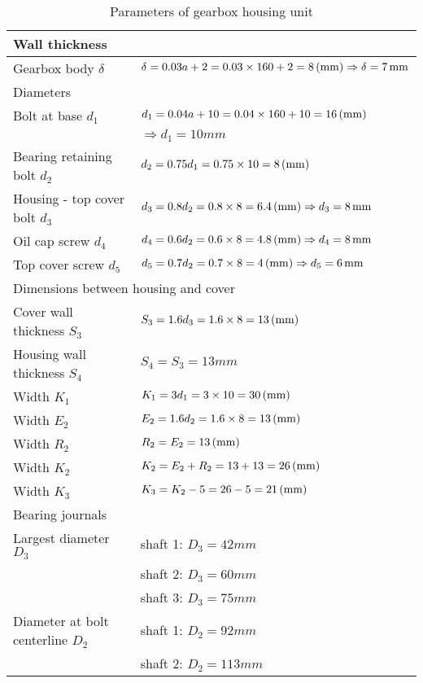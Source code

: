 \begin{table}
	\centering
	\caption{Parameters of gearbox housing unit}
	\begin{tabular}{ll}\toprule
		Wall thickness & \\\midrule
		Gearbox body $ \delta $ & $ \delta = 0.03a + 2 = 0.03\times 160 + 2 = 8 \, (\mathrm{mm}) \Rightarrow \delta = 7 \, \mathrm{mm}  $\\\midrule
		Diameters & \\\midrule
		Bolt at base $ d_1 $ & $ d_1 = 0.04a+10 = 0.04\times 160 + 10 = 16 \, (\mathrm{mm}) $\\
		& $ \Rightarrow d_1 = 10 \unit{mm}$\\
		Bearing retaining bolt $ d_2 $ & $ d_2 = 0.75d_1 = 0.75\times 10 = 8\, (\mathrm{mm})$\\
		Housing - top cover bolt $ d_3 $ & $ d_3 = 0.8 d_2 = 0.8\times 8 = 6.4 \, (\mathrm{mm}) \Rightarrow d_3 = 8\, \mathrm{mm} $\\
		Oil cap screw $ d_4 $ & $ d_4 = 0.6d_2 = 0.6\times 8 = 4.8 \, (\mathrm{mm}) \Rightarrow d_4 = 8\, \mathrm{mm} $\\
		Top cover screw $ d_5 $ & $ d_5  = 0.7 d_2 = 0.7\times 8 = 4 \, (\mathrm{mm})\Rightarrow d_5 = 6 \, \mathrm{mm} $\\\midrule
		\multicolumn{2}{l}{Dimensions between housing and cover} \\\midrule
		Cover wall thickness $ S_3 $ & $ S_3 = 1.6 d_3 = 1.6\times 8 = 13 \, (\mathrm{mm}) $\\
		Housing wall thickness $ S_4 $ & $ S_4 = S_3 = 13\unit{mm} $\\
		Width $ K_1 $ & $ K_1 = 3d_1 = 3\times 10 = 30 \, (\mathrm{mm})$\\
		Width $ E_2 $ & $ E_2 = 1.6d_2 = 1.6\times 8 = 13 \, (\mathrm{mm})$\\
		Width $ R_2 $ & $ R_2 = E_2 = 13 \, (\mathrm{mm})$\\
		Width $ K_2 $ & $ K_2 = E_2 + R_2 = 13+13 = 26 \, (\mathrm{mm})$\\
		Width $ K_3 $ & $ K_3 = K_2 - 5 = 26 - 5 = 21 \, (\mathrm{mm})$\\\midrule
		Bearing journals\\\midrule
		Largest diameter $ D_3 $ & shaft 1: $ D_3 = 42 \unit{mm} $\\
		& shaft 2: $ D_3 = 60 \unit{mm} $\\
		& shaft 3: $ D_3 = 75 \unit{mm} $\\
		Diameter at bolt centerline $ D_2 $ & shaft 1: $ D_2 = 92 \unit{mm} $\\
		& shaft 2: $ D_2 = 113 \unit{mm} $\\

\end{tabular}
\end{table}
